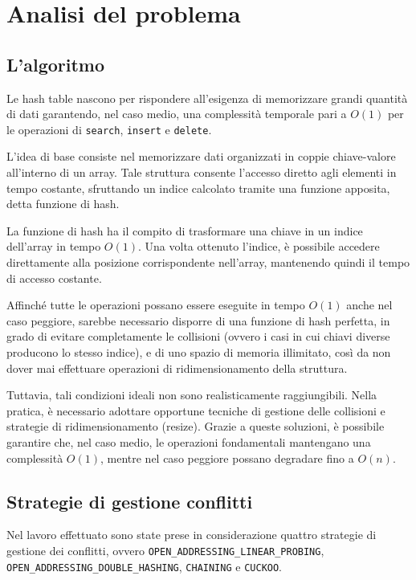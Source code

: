 \chapter{Analisi del problema}

\section{L'algoritmo}
Le hash table nascono per rispondere all'esigenza di memorizzare grandi quantità di dati garantendo, nel caso medio, una complessità 
temporale pari a $O(1)$ per le operazioni di \texttt{search}, \texttt{insert} e \texttt{delete}.

L'idea di base consiste nel memorizzare dati organizzati in coppie chiave-valore all'interno di un array. Tale struttura consente l'accesso 
diretto agli elementi in tempo costante, sfruttando un indice calcolato tramite una funzione apposita, detta funzione di hash.

La funzione di hash ha il compito di trasformare una chiave in un indice dell'array in tempo $O(1)$. Una volta ottenuto l'indice, 
è possibile accedere direttamente alla posizione corrispondente nell'array, mantenendo quindi il tempo di accesso costante.

Affinché tutte le operazioni possano essere eseguite in tempo $O(1)$ anche nel caso peggiore, sarebbe necessario disporre di una funzione 
di hash perfetta, in grado di evitare completamente le collisioni (ovvero i casi in cui chiavi diverse producono lo stesso indice), 
e di uno spazio di memoria illimitato, così da non dover mai effettuare operazioni di ridimensionamento della struttura.

Tuttavia, tali condizioni ideali non sono realisticamente raggiungibili. Nella pratica, è necessario adottare opportune tecniche di gestione 
delle collisioni e strategie di ridimensionamento (resize). Grazie a queste soluzioni, è possibile garantire che, nel caso medio, 
le operazioni fondamentali mantengano una complessità $O(1)$, mentre nel caso peggiore possano degradare fino a $O(n)$.

\section{Strategie di gestione conflitti}
Nel lavoro effettuato sono state prese in considerazione quattro strategie di gestione dei conflitti, ovvero
\texttt{OPEN\_ADDRESSING\_LINEAR\_PROBING}, \break
\texttt{OPEN\_ADDRESSING\_DOUBLE\_HASHING},
\texttt{CHAINING} e \texttt{CUCKOO}.

